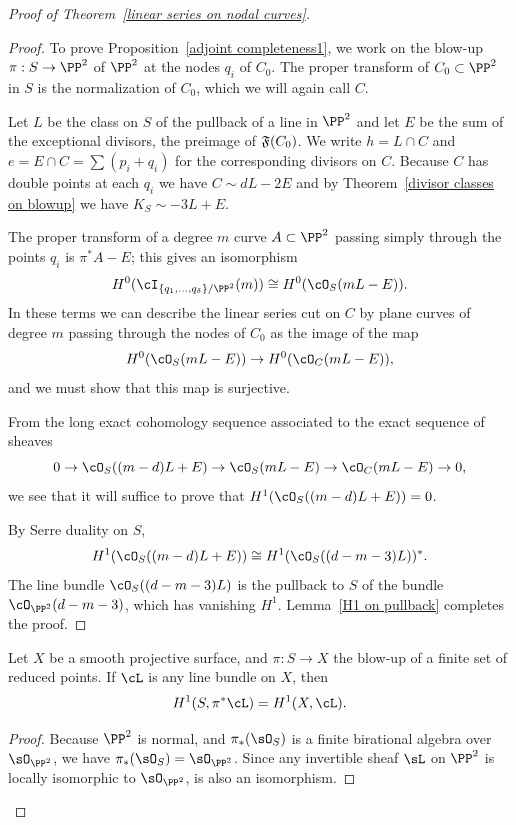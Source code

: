 \begin{proof}[Proof of Theorem~\ref{linear series on nodal curves}]
\begin{proof}
To prove Proposition~\ref{adjoint completeness1}, we work on the blow-up $\pi : S \to \PP^2$ of $\PP^2$ at the nodes $q_i$ of $C_0$. The proper transform of $C_0 \subset \PP^2$ in $S$ is the normalization of $C_0$, which we will again call $C$.

Let $L$ be the class on $S$ of the pullback of a line in $\PP^2$  and let $E$ be the sum of the exceptional divisors, the preimage of $\adj(C_{0})$. We write $h= L\cap C$ and $e = E\cap C= \sum (p_i+q_i)$ for the corresponding divisors on $C$. 
Because $C$ has double points at each $q_{i}$ we have
$
C \sim dL - 2E 
$
and   by
Theorem~\ref{divisor classes on blowup} we have $K_S \sim -3L + E$.

The proper transform of a degree $m$ curve $A\subset \PP^2$  passing simply through the points $q_i$
is $\pi^*A - E$; this gives an isomorphism
$$
H^0(\cI_{\{q_1,\dots,q_\delta\}/\PP^2}(m)) \cong H^0(\cO_S(mL-E)).
$$
In these terms we can describe the linear series cut on $C$ by plane curves of degree $m$ passing through the nodes of $C_0$ as the image of the map
$$
H^0(\cO_S(mL-E)) \to H^0(\cO_C(mL-E)),
$$
and we must show that this map is surjective.

From the long exact cohomology sequence associated to the exact sequence of sheaves
$$
0 \to \cO_S((m-d)L + E)  \to \cO_S(mL-E) \to \cO_C(mL-E) \to 0,
$$
 we see that it will suffice to prove that $H^1(\cO_S((m-d)L + E)) = 0$. 
 
By Serre duality on $S$,
$$
H^1(\cO_S((m-d)L + E)) \cong H^1(\cO_S((d-m-3)L))^*.
$$
The line bundle $\cO_S((d-m-3)L)$ is 
 the pullback to $S$ of the bundle $\cO_{\PP^2}(d-m-3)$, which has vanishing $H^1$. Lemma~\ref{H1 on pullback} completes the proof.
\end{proof}

\begin{lemma}\label{H1 on pullback}
Let $X$ be a smooth projective surface, and $\pi : S \to X$ the blow-up of a finite set of reduced points. If $\cL$ is any line bundle on $X$, then
$$
H^1(S, \pi^*\cL) = H^1(X, \cL).
$$
\end{lemma}

\begin{proof} Because $\PP^2$ is normal, and $\pi_*(\sO_S)$ is a finite birational algebra over $\sO_{\PP^2}$, we have $\pi_*(\sO_S) = \sO_{\PP^2}$.
Since any invertible sheaf $\sL$ on $\PP^{2}$ is locally isomorphic to $\sO_{\PP^2}$,   is also an isomorphism. 


\end{proof}
\end{proof}
